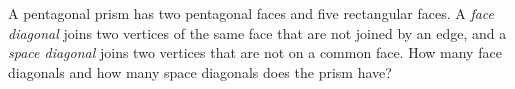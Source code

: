 A pentagonal prism has two pentagonal faces and five rectangular faces. A \emph{face diagonal} joins two vertices of the same face that are not joined by an edge, and a \emph{space diagonal} joins two vertices that are not on a common face. How many face diagonals and how many space diagonals does the prism have?
